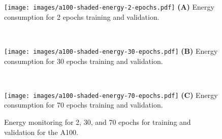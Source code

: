 \begin{figure}[p]

  \begin{center}
     \begin{minipage}[t]{0.30\textwidth}
        \texttt{[image: images/a100-shaded-energy-2-epochs.pdf]}
        {\bf (A)} Energy consumption for 2 epochs training and validation.
     \end{minipage}
     \ \
     \begin{minipage}[t]{0.30\textwidth}
        \texttt{[image: images/a100-shaded-energy-30-epochs.pdf]}
        {\bf (B)} Energy consumption for 30 epochs training and validation.
     \end{minipage}
     \ \
     \begin{minipage}[t]{0.30\textwidth}
        \texttt{[image: images/a100-shaded-energy-70-epochs.pdf]}
        {\bf (C)} Energy consumption for 70 epochs training and validation.
     \end{minipage}
  \end{center}

  \caption {Energy monitoring for 2, 30, and 70 epochs for training and validation for the A100.}
  \label{fig:energy}

\end{figure}

\begin{comment}




  \begin{figure}[p]

  \begin{center}
     \begin{minipage}[t]{0.30\textwidth}
        \includegraphics[width=1.0\linewidth]
        {\bf (A)} Energy trace for 2 epochs training and validation.
     \end{minipage}
     \ \
     \begin{minipage}[t]{0.30\textwidth}
        \texttt{[image: images/v100-shaded-energy-30-epochs.pdf]}
        {\bf (B)} Energy trace for 30 epochs training and validation.
     \end{minipage}
     \ \
     \begin{minipage}[t]{0.30\textwidth}
       \texttt{[image: images/v100-shaded-energy-70-epochs.pdf]}
        {\bf (C)} Energy trace for 70 epochs training and validation.
     \end{minipage}
  \end{center}

  \caption {Energy monitoring for 2, 30, and 70 epochs for training and validation for the A100.}
  \label{fig:energy}

  \end{figure}
\end{comment}
